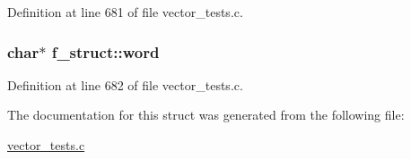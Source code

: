 \-Definition at line 681 of file vector\-\_\-tests.\-c.

\hypertarget{structf__struct_aa8f65f08c5e6180da916f9001438eab5}{
\subsubsection[{word}]{\setlength{\rightskip}{0pt plus 5cm}char$\ast$ {\bf f\-\_\-struct\-::word}}}\label{structf__struct_aa8f65f08c5e6180da916f9001438eab5}


\-Definition at line 682 of file vector\-\_\-tests.\-c.



\-The documentation for this struct was generated from the following file\-:\begin{DoxyCompactItemize}
\item 
\hyperlink{vector__tests_8c}{vector\-\_\-tests.\-c}\end{DoxyCompactItemize}
